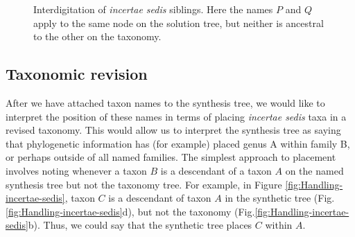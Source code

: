 \documentclass[english]{article}
\begin{document}
\begin{figure}
\hfill{}
\hfill{}
\hfill{}
\caption{\label{fig:interdigitation}Interdigitation of \emph{incertae sedis} siblings.  Here the names $P$ and $Q$ apply to the same node on the solution tree, but neither is ancestral to the other on the taxonomy.}
\end{figure}



\subsection{Taxonomic revision}\label{subsec:Placement}

After we have attached taxon names to the synthesis tree, we would
like to interpret the position of these names in terms of placing
\emph{incertae sedis }taxa in a revised taxonomy.
This would allow us
to interpret the synthesis tree as saying that phylogenetic
information has (for example) placed genus A within family B, or
perhaps outside of all named families.
The simplest approach to
placement involves noting whenever a taxon $B$ is a descendant of a
taxon $A$ on the named synthesis tree but not the taxonomy tree.
For
example, in Figure \ref{fig:Handling-incertae-sedis}, taxon $C$ is a
descendant of taxon $A$ in the synthetic tree 
(Fig.\ref{fig:Handling-incertae-sedis}d), but not the taxonomy 
(Fig.\ref{fig:Handling-incertae-sedis}b).
Thus, we could say that the synthetic tree places
$C$ within $A$. 
\end{document}
